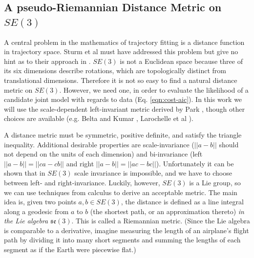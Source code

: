 \documentclass[letterpaper, 10 pt, conference]{ieeeconf}  %
\begin{document}
\subsection{A pseudo-Riemannian Distance Metric on $SE(3)$}\label{sec:metric}
A central problem in the mathematics of trajectory fitting is a distance function in trajectory space. Sturm et al must have addressed this problem but give no hint as to their approach in \cite{Sturm2011}. $SE(3)$ is not a Euclidean space because three of its six dimensions describe rotations, which are topologically distinct from translational dimensions. Therefore it is not so easy to find a natural distance metric on $SE(3)$. However, we need one, in order to evaluate the likelihood of a candidate joint model with regards to data (Eq. \ref{eqn:cost-aic}). In this work we will use the scale-dependent left-invariant metric derived by Park \cite{Park1995}, though other choices are available (e.g. Belta and Kumar \cite{Belta2002}, Larochelle et al \cite{Larochelle2007}).

A distance metric must be symmetric, positive definite, and satisfy the triangle inequality. Additional desirable properties are scale-invariance ($||a-b||$ should not depend on the units of each dimension) and bi-invariance (left $||a-b|| = ||ca-cb||$ and right $||a-b|| = ||ac-bc||$). Unfortunately it can be shown \cite{Park1995} that in $SE(3)$ scale invariance is impossible, and we have to choose between left- and right-invariance. Luckily, however, $SE(3)$ is a Lie group, so we can use techniques from calculus to derive an acceptable metric. The main idea is, given two points $a, b \in SE(3)$, the distance is defined as a line integral along a geodesic from $a$ to $b$ (the shortest path, or an approximation thereto) \emph{in the Lie algebra $\mathfrak{se}(3)$}. This is called a Riemannian metric. (Since the Lie algebra is comparable to a derivative, imagine measuring the length of an airplane's flight path by dividing it into many short segments and summing the lengths of each segment as if the Earth were piecewise flat.)
\end{document}
